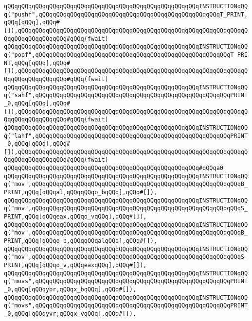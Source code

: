 \verb|qQQqqQQqqQQqqQQqqQQqqQQqqQQqqQQqqQQqqQQqqQQqqQQqqQQqqQQqINSTRUCTIONqQQq("pushf",qQQqqQQqqQQqqQQqqQQqqQQqqQQqqQQqqQQqqQQqqQQqqQQqqQQqT_PRINT,qQQq[qQQq],qQQq#[]),qQQqqQQqqQQqqQQqqQQqqQQqqQQqqQQqqQQqqQQqqQQqqQQqqQQqqQQqqQQqqQQqqQQqqQQqqQQqqQQqqQQq#qQQq(fwait)|\newline
\verb|qQQqqQQqqQQqqQQqqQQqqQQqqQQqqQQqqQQqqQQqqQQqqQQqqQQqqQQqINSTRUCTIONqQQq("popf",qQQqqQQqqQQqqQQqqQQqqQQqqQQqqQQqqQQqqQQqqQQqqQQqqQQqqQQqT_PRINT,qQQq[qQQq],qQQq#[]),qQQqqQQqqQQqqQQqqQQqqQQqqQQqqQQqqQQqqQQqqQQqqQQqqQQqqQQqqQQqqQQqqQQqqQQqqQQqqQQqqQQq#qQQq(fwait)|\newline
\verb|qQQqqQQqqQQqqQQqqQQqqQQqqQQqqQQqqQQqqQQqqQQqqQQqqQQqqQQqINSTRUCTIONqQQq("sahf",qQQqqQQqqQQqqQQqqQQqqQQqqQQqqQQqqQQqqQQqqQQqqQQqqQQqqQQqPRINT_0,qQQq[qQQq],qQQq#[]),qQQqqQQqqQQqqQQqqQQqqQQqqQQqqQQqqQQqqQQqqQQqqQQqqQQqqQQqqQQqqQQqqQQqqQQqqQQqqQQqqQQq#qQQq(fwait)|\newline
\verb|qQQqqQQqqQQqqQQqqQQqqQQqqQQqqQQqqQQqqQQqqQQqqQQqqQQqqQQqINSTRUCTIONqQQq("lahf",qQQqqQQqqQQqqQQqqQQqqQQqqQQqqQQqqQQqqQQqqQQqqQQqqQQqqQQqPRINT_0,qQQq[qQQq],qQQq#[]),qQQqqQQqqQQqqQQqqQQqqQQqqQQqqQQqqQQqqQQqqQQqqQQqqQQqqQQqqQQqqQQqqQQqqQQqqQQqqQQqqQQq#qQQq(fwait)|\newline
\verb|qQQqqQQqqQQqqQQqqQQqqQQqqQQqqQQqqQQqqQQqqQQqqQQqqQQqqQQq#qQQqa0|\newline
\verb|qQQqqQQqqQQqqQQqqQQqqQQqqQQqqQQqqQQqqQQqqQQqqQQqqQQqqQQqINSTRUCTIONqQQq("mov",qQQqqQQqqQQqqQQqqQQqqQQqqQQqqQQqqQQqqQQqqQQqqQQqqQQqqQQqqQQqB_PRINT,qQQq[qQQqal,qQQqqQQqo_bqQQq],qQQq#[]),|\newline
\verb|qQQqqQQqqQQqqQQqqQQqqQQqqQQqqQQqqQQqqQQqqQQqqQQqqQQqqQQqINSTRUCTIONqQQq("mov",qQQqqQQqqQQqqQQqqQQqqQQqqQQqqQQqqQQqqQQqqQQqqQQqqQQqqQQqqQQqS_PRINT,qQQq[qQQqeax,qQQqo_vqQQq],qQQq#[]),|\newline
\verb|qQQqqQQqqQQqqQQqqQQqqQQqqQQqqQQqqQQqqQQqqQQqqQQqqQQqqQQqINSTRUCTIONqQQq("mov",qQQqqQQqqQQqqQQqqQQqqQQqqQQqqQQqqQQqqQQqqQQqqQQqqQQqqQQqqQQqB_PRINT,qQQq[qQQqo_b,qQQqqQQqalqQQq],qQQq#[]),|\newline
\verb|qQQqqQQqqQQqqQQqqQQqqQQqqQQqqQQqqQQqqQQqqQQqqQQqqQQqqQQqINSTRUCTIONqQQq("mov",qQQqqQQqqQQqqQQqqQQqqQQqqQQqqQQqqQQqqQQqqQQqqQQqqQQqqQQqqQQqS_PRINT,qQQq[qQQqo_v,qQQqeaxqQQq],qQQq#[]),|\newline
\verb|qQQqqQQqqQQqqQQqqQQqqQQqqQQqqQQqqQQqqQQqqQQqqQQqqQQqqQQqINSTRUCTIONqQQq("movs",qQQqqQQqqQQqqQQqqQQqqQQqqQQqqQQqqQQqqQQqqQQqqQQqqQQqqQQqPRINT_0,qQQq[qQQqybr,qQQqx_bqQQq],qQQq#[]),|\newline
\verb|qQQqqQQqqQQqqQQqqQQqqQQqqQQqqQQqqQQqqQQqqQQqqQQqqQQqqQQqINSTRUCTIONqQQq("movs",qQQqqQQqqQQqqQQqqQQqqQQqqQQqqQQqqQQqqQQqqQQqqQQqqQQqqQQqPRINT_0,qQQq[qQQqyvr,qQQqx_vqQQq],qQQq#[]),|\newline
